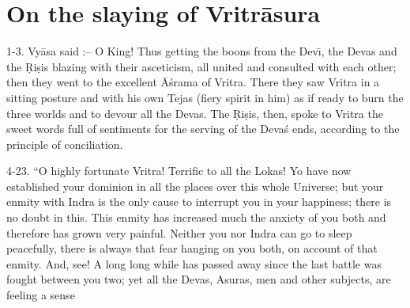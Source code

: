 \chapter{On the slaying of Vritr\=asura}

1-3. Vy\=asa said :-- O King! Thus getting the boons from the Dev\={\i}, the Devas and the \d{R}i\d{s}is blazing with their asceticism, all united and consulted with each other; then they went to the excellent \=A\'srama of Vritra. There they saw Vritra in a sitting posture and with his own Tejas (fiery spirit in him) as if ready to burn the three worlds and to devour all the Devas. The \d{R}i\d{s}is, then, spoke to Vritra the sweet words full of sentiments for the serving of the Deva\'s ends, according to the principle of conciliation.

4-23. ``O highly fortunate Vritra! Terrific to all the Lokas! Yo have now established your dominion in all the places over this whole Universe; but your enmity with Indra is the only cause to interrupt you in your happiness; there is no doubt in this. This enmity has increased much the anxiety of you both and therefore has grown very painful. Neither you nor Indra can go to sleep peacefully, there is always that fear hanging on you both, on account of that enmity. And, see! A long long while has passed away since the last battle was fought between you two; yet all the Devas, Asuras, men and other subjects, are feeling a sense

